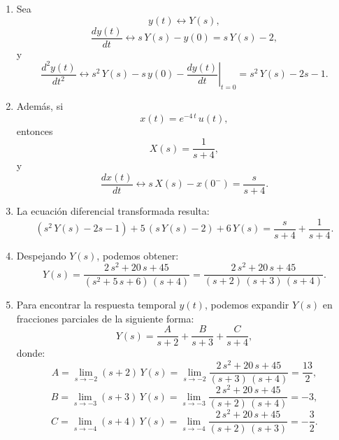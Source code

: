 \documentclass[11pt,a4paper,openany]{book}
\begin{document}
\begin{enumerate}
	\item Sea \begin{equation}y(t) \leftrightarrow Y(s),\end{equation}
	\begin{equation}\frac{dy(t)}{dt} \leftrightarrow s \, Y(s) - y(0) = s \, Y(s) - 2,\end{equation}
	y \begin{equation}
		\frac{d^{2}y(t)}{dt^{2}} \leftrightarrow s^{2} \, Y(s) - s \, y(0) - \left. \frac{dy(t)}{dt}\right|_{t=0} = s^{2} \, Y(s) - 2s - 1.
	\end{equation}
	
	\item Además, si \begin{equation}x(t) = e^{-4 \, t} \, u(t),\end{equation} entonces \begin{equation}X(s) = \frac{1}{s + 4},\end{equation}
	y \begin{equation}\frac{dx(t)}{dt} \leftrightarrow s \, X(s) - x(0^{-}) = \frac{s}{s+4}.\end{equation} 
	
	\item La ecuación diferencial transformada resulta:
	\begin{equation}
		(s^{2} \, Y(s) - 2s - 1) + 5 \, (s \, Y(s) - 2) + 6 \, Y(s) = \frac{s}{s+4} + \frac{1}{s+4}.
	\end{equation}
	
	\item Despejando $Y(s)$, podemos obtener:
	\begin{equation}
		Y(s) = \frac{2 \, s^{2} + 20 \, s + 45}{(s^{2} + 5 \, s + 6) \, (s + 4)} = \frac{2 \, s^{2} + 20 \, s + 45}{(s + 2) \, (s + 3) \, (s + 4)}.
	\end{equation}
	
	\item Para encontrar la respuesta temporal $y(t)$, podemos expandir $Y(s)$ en fracciones parciales de la siguiente forma:
	\begin{equation}
		Y(s) = \frac{A}{s+2} + \frac{B}{s+3} + \frac{C}{s+4},
	\end{equation}
	donde:
	\begin{equation}
		A = \lim_{s \to -2} (s + 2) \, Y(s) = \lim_{s \to -2} \frac{2 \, s^{2} + 20 \, s + 45}{(s + 3) \, (s + 4)} = \frac{13}{2}, 
	\end{equation}
	\begin{equation}
		B = \lim_{s \to -3} (s + 3) \, Y(s) = \lim_{s \to -3} \frac{2 \, s^{2} + 20 \, s + 45}{(s + 2) \, (s + 4)} = -3, 
	\end{equation}
	\begin{equation}
		C = \lim_{s \to -4} (s + 4) \, Y(s) = \lim_{s \to -4} \frac{2 \, s^{2} + 20 \, s + 45}{(s + 2) \, (s + 3)} = -\frac{3}{2}.
	\end{equation}
	

\end{enumerate}
\end{document}
